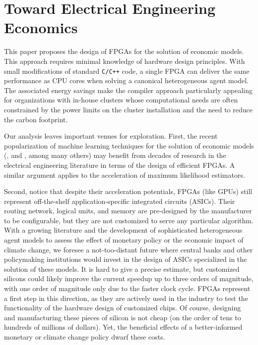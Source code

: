 \documentclass[12pt,american]{article}
\makeatletter
\newcommand{\resultsfolder}{./results}
\newcommand{\baselinespeedupFPGAICPUI}{\@\xspace}
\makeatother
\begin{document}
\section{Toward Electrical Engineering Economics}\label{sec:con}

This paper proposes the design of FPGAs for the solution of economic models. This approach requires minimal knowledge of hardware design principles. With small modifications of standard \texttt{C/C++} code, a single FPGA can deliver the same performance as \baselinespeedupFPGAICPUI\hspace{-0.2cm}CPU cores when solving a canonical heterogeneous agent model. The associated energy savings make the compiler approach particularly appealing for organizations with in-house clusters whose computational needs are often constrained by the power limits on the cluster installation and the need to reduce the carbon footprint. 

Our analysis leaves important venues for exploration. First, the recent popularization of machine learning techniques for the solution of economic models (\citealp{fernandez2019financial}, and \citealp{MahdiEbrahimiKahou2021}, among many others) may benefit from decades of research in the electrical engineering literature \citep{Nurvitadhi2017} in terms of the design of efficient FPGAs. A similar argument applies to the acceleration of maximum likelihood estimators.

Second, notice that despite their acceleration potentials, FPGAs (like GPUs) still represent off-the-shelf application-specific integrated circuits (ASICs). Their routing network, logical units, and memory are pre-designed by the manufacturer to be configurable, but they are not customized to serve any particular algorithm. With a growing literature and the development of sophisticated heterogeneous agent models to assess the effect of monetary policy or the economic impact of climate change, we foresee a not-too-distant future where central banks and other policymaking institutions would invest in the design of ASICs specialized in the solution of these models. It is hard to give a precise estimate, but customized silicons could likely improve the current speedup up to three orders of magnitude, with one order of magnitude only due to the faster clock cycle. FPGAs represent a first step in this direction, as they are actively used in the industry to test the functionality of the hardware design of customized chips. Of course, designing and manufacturing these pieces of silicon is not cheap (on the order of tens to hundreds of millions of dollars). Yet, the beneficial effects of a better-informed monetary or climate change policy dwarf these costs.
\end{document}
